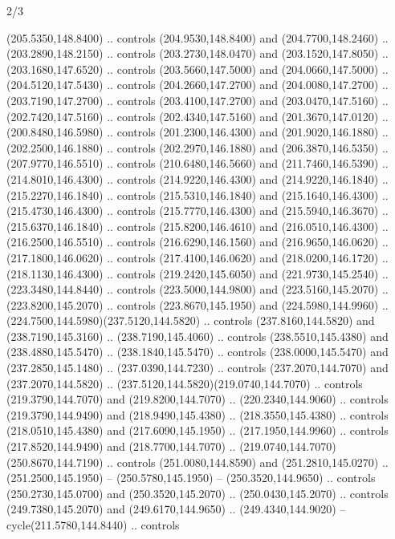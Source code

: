\begin{flagdescription}{2/3}
\begin{scope}[xshift=0.5\flaglength,yshift=0.5\flagwidth,scale=\flagwidth/259.2]
\begin{scope}[y=0.8pt, x=0.8pt, yscale=-1,shift={(-243,-162)}]
      (205.5350,148.8400) .. controls (204.9530,148.8400) and (204.7700,148.2460) ..
      (203.2890,148.2150) .. controls (203.2730,148.0470) and (203.1520,147.8050) ..
      (203.1680,147.6520) .. controls (203.5660,147.5000) and (204.0660,147.5000) ..
      (204.5120,147.5430) .. controls (204.2660,147.2700) and (204.0080,147.2700) ..
      (203.7190,147.2700) .. controls (203.4100,147.2700) and (203.0470,147.5160) ..
      (202.7420,147.5160) .. controls (202.4340,147.5160) and (201.3670,147.0120) ..
      (200.8480,146.5980) .. controls (201.2300,146.4300) and (201.9020,146.1880) ..
      (202.2500,146.1880) .. controls (202.2970,146.1880) and (206.3870,146.5350) ..
      (207.9770,146.5510) .. controls (210.6480,146.5660) and (211.7460,146.5390) ..
      (214.8010,146.4300) .. controls (214.9220,146.4300) and (214.9220,146.1840) ..
      (215.2270,146.1840) .. controls (215.5310,146.1840) and (215.1640,146.4300) ..
      (215.4730,146.4300) .. controls (215.7770,146.4300) and (215.5940,146.3670) ..
      (215.6370,146.1840) .. controls (215.8200,146.4610) and (216.0510,146.4300) ..
      (216.2500,146.5510) .. controls (216.6290,146.1560) and (216.9650,146.0620) ..
      (217.1800,146.0620) .. controls (217.4100,146.0620) and (218.0200,146.1720) ..
      (218.1130,146.4300) .. controls (219.2420,145.6050) and (221.9730,145.2540) ..
      (223.3480,144.8440) .. controls (223.5000,144.9800) and (223.5160,145.2070) ..
      (223.8200,145.2070) .. controls (223.8670,145.1950) and (224.5980,144.9960) ..
      (224.7500,144.5980)(237.5120,144.5820) .. controls (237.8160,144.5820) and
      (238.7190,145.3160) .. (238.7190,145.4060) .. controls (238.5510,145.4380) and
      (238.4880,145.5470) .. (238.1840,145.5470) .. controls (238.0000,145.5470) and
      (237.2850,145.1480) .. (237.0390,144.7230) .. controls (237.2070,144.7070) and
      (237.2070,144.5820) .. (237.5120,144.5820)(219.0740,144.7070) .. controls
      (219.3790,144.7070) and (219.8200,144.7070) .. (220.2340,144.9060) .. controls
      (219.3790,144.9490) and (218.9490,145.4380) .. (218.3550,145.4380) .. controls
      (218.0510,145.4380) and (217.6090,145.1950) .. (217.1950,144.9960) .. controls
      (217.8520,144.9490) and (218.7700,144.7070) ..
      (219.0740,144.7070)(250.8670,144.7190) .. controls (251.0080,144.8590) and
      (251.2810,145.0270) .. (251.2500,145.1950) -- (250.5780,145.1950) --
      (250.3520,144.9650) .. controls (250.2730,145.0700) and (250.3520,145.2070) ..
      (250.0430,145.2070) .. controls (249.7380,145.2070) and (249.6170,144.9650) ..
      (249.4340,144.9020) -- cycle(211.5780,144.8440) .. controls

\end{scope}
\end{scope}
\end{flagdescription}
